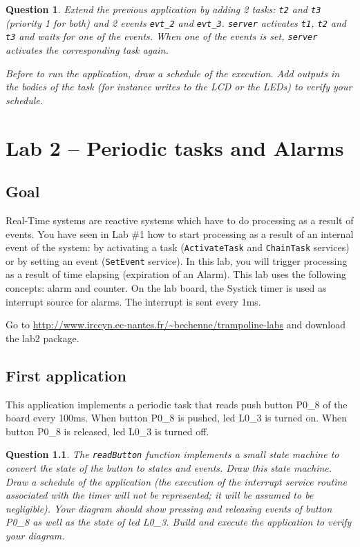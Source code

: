 \documentclass[11pt]{report}
\newtheorem{ex}{Question}
\begin{document}
\begin{ex}
Extend the previous application by adding 2 tasks: \texttt{t2} and \texttt{t3} (priority 1 for both) and 2 events \texttt{evt_2} and \texttt{evt_3}. \texttt{server} activates \texttt{t1}, \texttt{t2} and \texttt{t3} and waits for one of the events. When one of the events is set, \texttt{server} activates the corresponding task again.


Before to run the application, draw a schedule of the execution. Add outputs in the bodies of the task (for instance writes to the LCD or the LEDs) to verify your schedule.
\end{ex}

\chapter{Lab 2 -- Periodic tasks and Alarms}

\section{Goal}

Real-Time systems are reactive systems which have to do processing as a result of events. You have seen in Lab \#1 how to start processing as a result of an internal event of the system: by activating a task (\texttt{ActivateTask} and \texttt{ChainTask} services) or by setting an event (\texttt{SetEvent} service). In this lab, you will trigger processing as a result of time elapsing (expiration of an Alarm). This lab uses the following concepts: alarm and counter. On the lab board, the Systick timer is used as interrupt source for alarms. The interrupt is sent every 1ms.

Go to \url{http://www.irccyn.ec-nantes.fr/~bechenne/trampoline-labs} and download the lab2 package.

\section{First application}

This application implements a periodic task that reads push button P0_8 of the board every 100ms.
When button P0_8 is pushed, led L0_3 is turned on.
When button P0_8 is released, led L0_3 is turned off.

\begin{ex}
The {\tt readButton} function implements a small state machine to convert the state of the button to states and events.
Draw this state machine.
Draw a schedule of the application (the execution of the interrupt service routine associated with the timer will not be represented; it will be assumed to be negligible).
Your diagram should show pressing and releasing events of button P0_8 as well as the state of led L0_3.
Build and execute the application to verify your diagram.
\end{ex}
\end{document}
